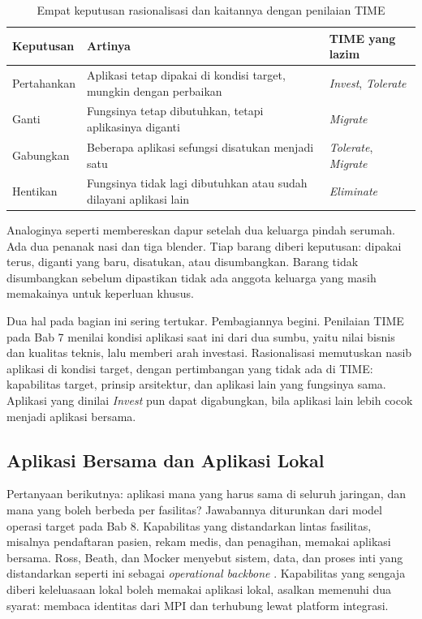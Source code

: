 \begin{table}[!htb]
  \centering
  \caption{Empat keputusan rasionalisasi dan kaitannya dengan penilaian TIME}
  \label{tab:ch09-empat-keputusan}
  \small
  \begin{tabularx}{\textwidth}{lXl}
    \hline
    \textbf{Keputusan} & \textbf{Artinya} & \textbf{TIME yang lazim} \\
    \hline
    Pertahankan & Aplikasi tetap dipakai di kondisi target, mungkin dengan perbaikan & \textit{Invest}, \textit{Tolerate} \\
    \hline
    Ganti & Fungsinya tetap dibutuhkan, tetapi aplikasinya diganti & \textit{Migrate} \\
    \hline
    Gabungkan & Beberapa aplikasi sefungsi disatukan menjadi satu & \textit{Tolerate}, \textit{Migrate} \\
    \hline
    Hentikan & Fungsinya tidak lagi dibutuhkan atau sudah dilayani aplikasi lain & \textit{Eliminate} \\
    \hline
  \end{tabularx}
\end{table}

Analoginya seperti membereskan dapur setelah dua keluarga pindah serumah. Ada
dua penanak nasi dan tiga blender. Tiap barang diberi keputusan: dipakai
terus, diganti yang baru, disatukan, atau disumbangkan. Barang tidak
disumbangkan sebelum dipastikan tidak ada anggota keluarga yang masih
memakainya untuk keperluan khusus.

Dua hal pada bagian ini sering tertukar. Pembagiannya begini. Penilaian TIME
pada Bab 7 menilai kondisi aplikasi saat ini dari dua sumbu, yaitu nilai
bisnis dan kualitas teknis, lalu memberi arah investasi. Rasionalisasi
memutuskan nasib aplikasi di kondisi target, dengan pertimbangan yang tidak
ada di TIME: kapabilitas target, prinsip arsitektur, dan aplikasi lain yang
fungsinya sama. Aplikasi yang dinilai \textit{Invest} pun dapat digabungkan,
bila aplikasi lain lebih cocok menjadi aplikasi bersama.

\subsection*{Aplikasi Bersama dan Aplikasi Lokal}

Pertanyaan berikutnya: aplikasi mana yang harus sama di seluruh jaringan, dan
mana yang boleh berbeda per fasilitas? Jawabannya diturunkan dari model
operasi target pada Bab 8. Kapabilitas yang distandarkan lintas fasilitas,
misalnya pendaftaran pasien, rekam medis, dan penagihan, memakai aplikasi
bersama. Ross, Beath, dan Mocker menyebut sistem, data, dan proses inti yang
distandarkan seperti ini sebagai \textit{operational backbone}
\cite{ross2019}. Kapabilitas yang sengaja diberi keleluasaan lokal boleh
memakai aplikasi lokal, asalkan memenuhi dua syarat: membaca identitas dari
MPI dan terhubung lewat platform integrasi.

